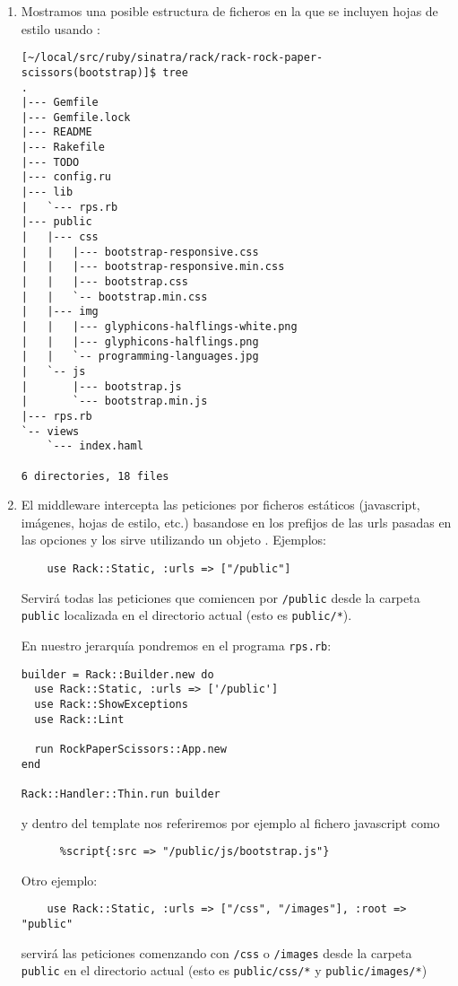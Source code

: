 \begin{enumerate}
\item 
Mostramos una posible estructura de ficheros  en la que se incluyen
hojas de estilo usando \bootstrap{}:
\begin{verbatim}
[~/local/src/ruby/sinatra/rack/rack-rock-paper-scissors(bootstrap)]$ tree
.
|--- Gemfile
|--- Gemfile.lock
|--- README
|--- Rakefile
|--- TODO
|--- config.ru
|--- lib
|   `--- rps.rb
|--- public
|   |--- css
|   |   |--- bootstrap-responsive.css
|   |   |--- bootstrap-responsive.min.css
|   |   |--- bootstrap.css
|   |   `-- bootstrap.min.css
|   |--- img
|   |   |--- glyphicons-halflings-white.png
|   |   |--- glyphicons-halflings.png
|   |   `-- programming-languages.jpg
|   `-- js
|       |--- bootstrap.js
|       `--- bootstrap.min.js
|--- rps.rb
`-- views
    `--- index.haml

6 directories, 18 files

\end{verbatim}
\item 
El middleware \rackstatic{} intercepta las peticiones por ficheros
estáticos (javascript, imágenes, hojas de estilo, etc.) 
basandose en los prefijos de las urls pasadas en las opciones y
los sirve utilizando un objeto \rackfile{}.
Ejemplos:

\begin{verbatim}
    use Rack::Static, :urls => ["/public"]
\end{verbatim}
Servirá todas las peticiones que 
comiencen por \verb|/public| desde la carpeta \verb"public"
localizada en el directorio actual (esto
es \verb|public/*|).

En nuestro jerarquía pondremos en el programa \verb|rps.rb|:
\begin{verbatim}
builder = Rack::Builder.new do
  use Rack::Static, :urls => ['/public']
  use Rack::ShowExceptions
  use Rack::Lint

  run RockPaperScissors::App.new
end

Rack::Handler::Thin.run builder
\end{verbatim}

y dentro del template \haml{} nos referiremos por ejemplo al fichero javascript como

\begin{verbatim}
      %script{:src => "/public/js/bootstrap.js"}
\end{verbatim}
Otro ejemplo:
\begin{verbatim}
    use Rack::Static, :urls => ["/css", "/images"], :root => "public"
\end{verbatim}
servirá las peticiones comenzando con \verb|/css| o \verb|/images|
desde la carpeta \verb|public| en el directorio actual
(esto es 
\verb|public/css/*| y \verb|public/images/*|)


\end{enumerate}
